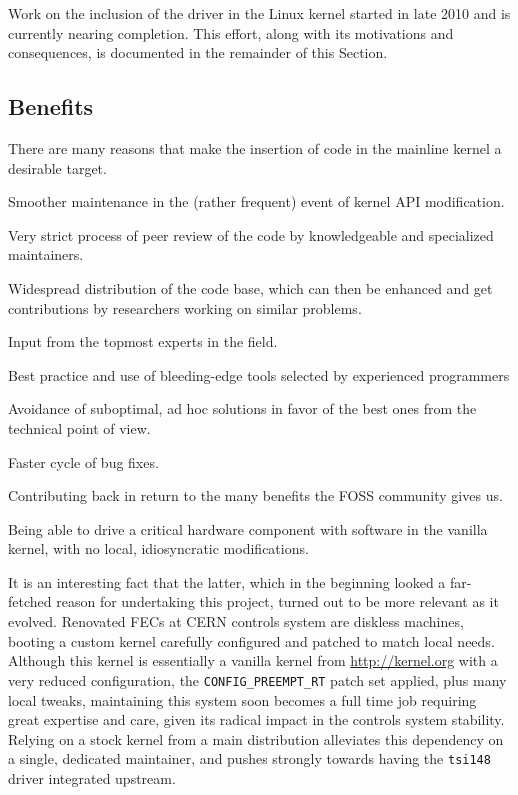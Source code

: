 \documentclass{JAC2003}
\begin{document}
Work on the inclusion of the driver in the Linux kernel started in late
2010 and is currently nearing completion. This effort, along with its
motivations and consequences, is documented in the remainder of this
Section.

\subsection{Benefits}

There are many reasons that make the insertion of code in the mainline kernel
a desirable target.

\begin{Itemize}
\item Smoother maintenance in the (rather frequent) event of kernel API
    modification.
\item Very strict process of peer review of the code by knowledgeable
    and specialized maintainers.
\item Widespread distribution of the code base, which can then be
    enhanced and get contributions by researchers working on similar
    problems.
\item Input from the topmost experts in the field.
\item Best practice and use of bleeding-edge tools selected by
    experienced programmers
\item Avoidance of suboptimal, ad hoc solutions in favor of the
    best ones from the technical point of view.
\item Faster cycle of bug fixes.
\item Contributing back in return to the many benefits the FOSS community
    gives us.
\item Being able to drive a critical hardware component with software
    in the vanilla kernel, with no local, idiosyncratic modifications.
\end{Itemize}

It is an interesting fact that the latter, which in the beginning looked
a far-fetched reason for undertaking this project, turned out to be
more relevant as it evolved. Renovated FECs at CERN controls system
are diskless machines, booting a custom kernel carefully configured and
patched to match local needs. Although this kernel is essentially a vanilla
kernel from \url{http://kernel.org} with a very reduced configuration, the
\verb|CONFIG_PREEMPT_RT| patch set applied, plus many local tweaks, maintaining
this system soon becomes a full time job requiring great expertise and care,
given its radical impact in the controls system stability. Relying on a
stock kernel from a main distribution alleviates this dependency on a single,
dedicated maintainer, and pushes strongly towards having the \texttt{tsi148}
driver integrated upstream.
\end{document}
